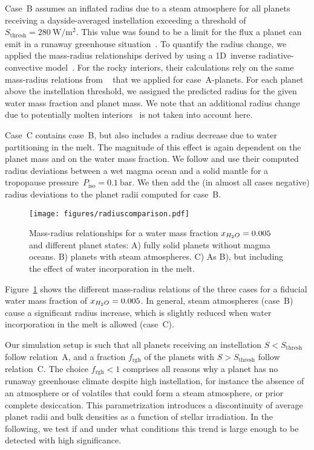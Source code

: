 \documentclass[modern]{aastex631}
\begin{document}
Case~B assumes an inflated radius due to a steam atmosphere for all planets receiving a dayside-averaged instellation exceeding a threshold of $S_\mathrm{thresh} = \SI{280}{\watt\per\meter\squared}$.
This value was found to be a limit for the flux a planet can emit in a runaway greenhouse situation~\citep{Goldblatt2013,Leconte2013}.
To quantify the radius change, we applied the mass-radius relationships derived by \citet{Turbet2020} using a 1D~inverse radiative-convective model~\citep{Turbet2019}.
For the rocky interiors, their calculations rely on the same mass-radius relations from ~\citep{Zeng2016} that we applied for case~A-planets.
For each planet above the instellation threshold, we assigned the predicted radius for the given water mass fraction and planet mass.
We note that an additional radius change due to potentially molten interiors~\citep{Bower2019} is not taken into account here.

Case~C contains case~B, but also includes a radius decrease due to water partitioning in the melt.
The magnitude of this effect is again dependent on the planet mass and on the water mass fraction.
We follow \citet{Dorn2021} and use their computed radius deviations between a wet magma ocean and a solid mantle for a tropopause pressure~$P_\mathrm{iso}=\SI{0.1}{\bar}$.
We then add the (in almost all cases negative) radius deviations to the planet radii computed for case~B.

\begin{figure}
    \begin{centering}
        \texttt{[image: figures/radiuscomparison.pdf]}
        \caption{Mass-radius relationships for a water mass fraction $x_{H_2O}= 0.005$ and different planet states: A) fully solid planets without magma oceans. B) planets with steam atmospheres. C) As B), but including the effect of water incorporation in the melt.}
        \label{fig:radiuscomparison}
    \end{centering}
\end{figure}

Figure~\ref{fig:radiuscomparison} shows the different mass-radius relations of the three cases for a fiducial water mass fraction of $x_{H_2O}= 0.005$.
In general, steam atmospheres (case~B) cause a significant radius increase, which is slightly reduced when water incorporation in the melt is allowed (case~C).

Our simulation setup is such that all planets receiving an instellation $S < S_\mathrm{thresh}$ follow relation~A, and a fraction $f_\mathrm{rgh}$ of the planets with $S > S_\mathrm{thresh}$ follow relation~C.
The choice $f_\mathrm{rgh} < 1$ comprises all reasons why a planet has no runaway greenhouse climate despite high instellation, for instance the absence of an atmosphere or of volatiles that could form a steam atmosphere, or prior complete desiccation.
This parametrization introduces a discontinuity of average planet radii and bulk densities as a function of stellar irradiation.
In the following, we test if and under what conditions this trend is large enough to be detected with high significance.
\end{document}
